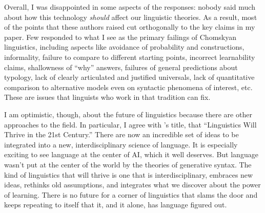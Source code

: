 \documentclass[output=paper,colorlinks,citecolor=brown
]{langscibook}
\begin{document}


% 
Overall, I was disappointed in some aspects of the responses: nobody said much about how this technology \textit{should} affect our linguistic theories. As a result, most of the points that these authors raised cut orthogonally to the key claims in my paper.  Few responded to what I see as the primary failings of Chomskyan linguistics, including aspects like avoidance of probability and constructions, informality, failure to compare to different starting points, incorrect learnability claims, shallowness of ``why'' answers, failures of general predictions about  typology, lack of clearly articulated and justified universals, lack of quantitative comparison to alternative models even on syntactic phenomena of interest, etc. These are issues that linguists who work in that tradition can fix. 

I am optimistic, though, about the future of linguistics because there are other approaches to the field. In particular, I agree with \citet{kodner2023linguistics}'s title, that ``Linguistics Will Thrive in the 21st Century.'' There are now an incredible set of ideas to be integrated into a new, interdisciplinary science of language. It is especially exciting to see language at the center of AI, which it well deserves. But language wasn't put at the center of the world by the theories of generative syntax. The kind of linguistics that will thrive is one that is interdisciplinary, embraces new ideas, rethinks old assumptions, and integrates what we discover about the power of learning. There is no future for a corner of linguistics that slams the door and keeps repeating to itself that it, and it alone, has language figured out. %












\end{document}
